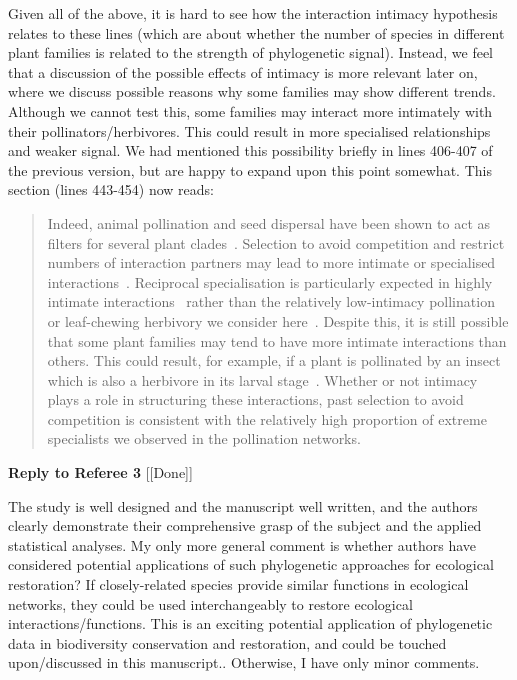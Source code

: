 \documentclass[12pt]{letter}
\newenvironment{refquote}{\bigskip \begin{it}}{\end{it}\smallskip}
\begin{document}
		Given all of the above, it is hard to see how the interaction intimacy hypothesis relates to these lines (which are about whether the number of species in different plant families is related to the strength of phylogenetic signal). Instead, we feel that a discussion of the possible effects of intimacy is more relevant later on, where we discuss possible reasons why some families may show different trends. Although we cannot test this, some families may interact more intimately with their pollinators/herbivores. This could result in more specialised relationships and weaker signal. We had mentioned this possibility briefly in lines 406-407 of the previous version, but are happy to expand upon this point somewhat. This section (lines 443-454) now reads:


		\begin{quotation}

			Indeed, animal pollination and seed dispersal have been shown to act
			as filters for several plant clades~\citep{Mayfield2009}. Selection to avoid 
			competition and restrict numbers of interaction partners may lead to
			more intimate or specialised interactions~\citep{Ponisio2017}. 
			Reciprocal specialisation is particularly expected in highly intimate interactions~\citep{Hembry2018} rather than the relatively low-intimacy pollination or leaf-chewing herbivory we consider here~\citep{Astegiano2017}.
			Despite this, it is still possible that some plant families may tend to have more intimate interactions than others. This could result, for example, if a plant is pollinated by an insect which is also a herbivore in its larval stage~\citep{Hembry2018}. 
			Whether or not intimacy plays a role in structuring these interactions, past selection to avoid competition is 
			consistent with the relatively high proportion of extreme specialists we
			observed in the pollination networks.

		\end{quotation}


\clearpage

{\Large \bf Reply to Referee 3} [[Done]]

	\begin{refquote}
		The study is well designed and the manuscript well written, and the authors clearly demonstrate their comprehensive grasp of the subject and the applied statistical analyses.
		My only more general comment is whether authors have considered potential applications of such phylogenetic approaches for ecological restoration? If closely-related species provide similar functions in ecological networks, they could be used interchangeably to restore ecological interactions/functions. This is an exciting potential application of phylogenetic data in biodiversity conservation and restoration, and could be touched upon/discussed in this manuscript.. 
		Otherwise, I have only minor comments.
	\end{refquote}
\end{document}
